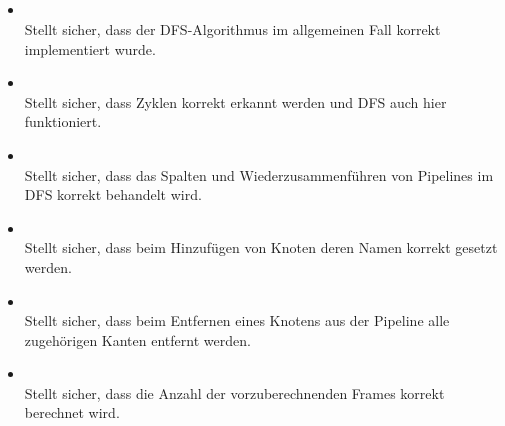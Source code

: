 \subsection{}

\subsection{}

\paragraph{}
\begin{itemize}
	\item{} \\
	Stellt sicher, dass der DFS-Algorithmus im allgemeinen Fall korrekt implementiert wurde.

	\item{} \\
	Stellt sicher, dass Zyklen korrekt erkannt werden und DFS auch hier funktioniert.

	\item{} \\
	Stellt sicher, dass das Spalten und Wiederzusammenführen von Pipelines im DFS korrekt behandelt wird.

	\item{} \\
	Stellt sicher, dass beim Hinzufügen von Knoten deren Namen korrekt gesetzt werden.

	\item{} \\
	Stellt sicher, dass beim Entfernen eines Knotens aus der Pipeline alle zugehörigen Kanten entfernt werden.

	\item{} \\
	Stellt sicher, dass die Anzahl der vorzuberechnenden Frames korrekt berechnet wird.
\end{itemize}

\subsection{}

\subsection{}

\subsection{}

\subsection{}